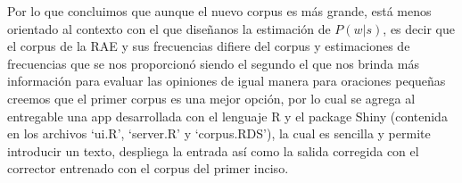 \documentclass[paper=letter, fontsize=11pt]{scrartcl}
\numberwithin{equation}{section} %
\numberwithin{figure}{section} %
\numberwithin{table}{section} %
\begin{document}
Por lo que concluimos que aunque el nuevo corpus es más grande, está menos orientado al contexto con el que diseñanos la estimación de $P(w|s)$, es decir que el corpus de la RAE y sus frecuencias difiere del corpus y estimaciones de frecuencias que se nos proporcionó siendo el segundo el que nos brinda más información para evaluar las opiniones de igual manera para oraciones pequeñas creemos que el primer corpus es una mejor opción, por lo cual se agrega al entregable una app desarrollada con el lenguaje R y el package Shiny (contenida en los archivos ‘ui.R’, ‘server.R’ y ‘corpus.RDS’), la cual es sencilla y permite introducir un texto, despliega la entrada así como la salida corregida con el corrector entrenado con el corpus del primer inciso.






\end{document}
